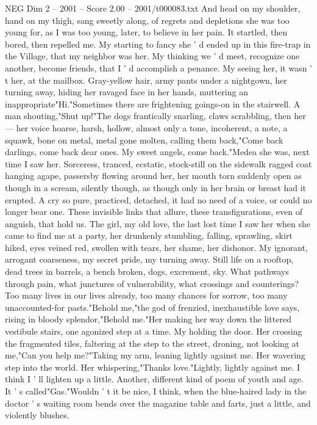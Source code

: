\begin{textsample}{NEG Dim 2 – 2001 – Score 2.00 – 2001/t000083.txt}
And head on my shoulder, hand on my thigh, sang sweetly along, of regrets and depletions she was too young for, as I was too young, later, to believe in her pain.
It startled, then bored, then repelled me.
My starting to fancy she ' d ended up in this fire-trap in the Village, that my neighbor was her.
My thinking we ' d meet, recognize one another, become friends, that I ' d accomplish a penance.
My seeing her, it wasn ' t her, at the mailbox.
Gray-yellow hair, army pants under a nightgown, her turning away, hiding her ravaged face in her hands, muttering an inappropriate"Hi."Sometimes there are frightening goings-on in the stairwell.
A man shouting,"Shut up!"The dogs frantically snarling, claws scrabbling, then her — her voice hoarse, harsh, hollow, almost only a tone, incoherent, a note, a squawk, bone on metal, metal gone molten, calling them back,"Come back darlings, come back dear ones.
My sweet angels, come back."Medea she was, next time I saw her.
Sorceress, tranced, ecstatic, stock-still on the sidewalk ragged coat hanging agape, passersby flowing around her, her mouth torn suddenly open as though in a scream, silently though, as though only in her brain or breast had it erupted.
A cry so pure, practiced, detached, it had no need of a voice, or could no longer bear one.
These invisible links that allure, these transfigurations, even of anguish, that hold us.
The girl, my old love, the last lost time I saw her when she came to find me at a party, her drunkenly stumbling, falling, sprawling, skirt hiked, eyes veined red, swollen with tears, her shame, her dishonor.
My ignorant, arrogant coarseness, my secret pride, my turning away.
Still life on a rooftop, dead trees in barrels, a bench broken, dogs, excrement, sky.
What pathways through pain, what junctures of vulnerability, what crossings and counterings?
Too many lives in our lives already, too many chances for sorrow, too many unaccounted-for pasts."Behold me,"the god of frenzied, inexhaustible love says, rising in bloody splendor,"Behold me."Her making her way down the littered vestibule stairs, one agonized step at a time.
My holding the door.
Her crossing the fragmented tiles, faltering at the step to the street, droning, not looking at me,"Can you help me?"Taking my arm, leaning lightly against me.
Her wavering step into the world.
Her whispering,"Thanks love."Lightly, lightly against me.
I think I ' ll lighten up a little.
Another, different kind of poem of youth and age.
It ' s called"Gas."Wouldn ' t it be nice, I think, when the blue-haired lady in the doctor ' s waiting room bends over the magazine table and farts, just a little, and violently blushes.

\end{textsample}
